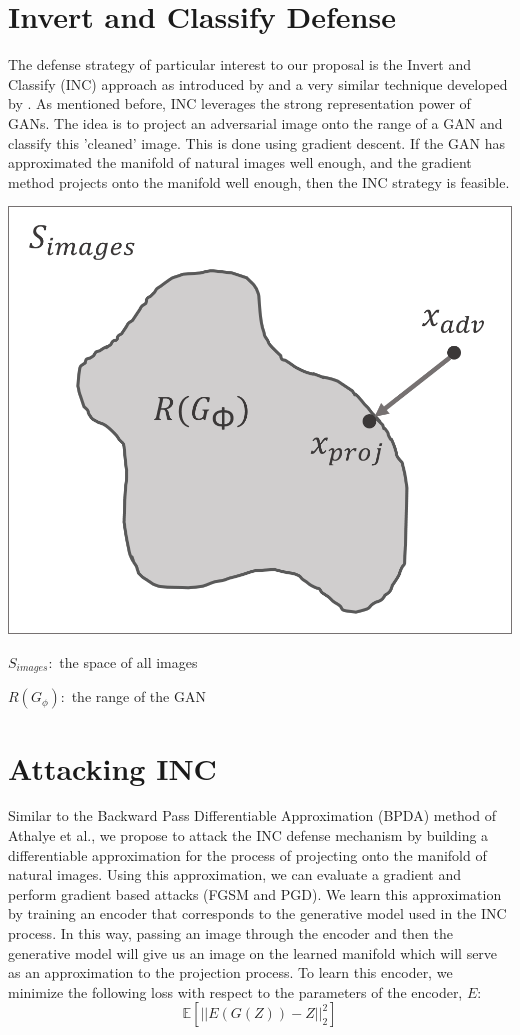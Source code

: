 \documentclass[twoside]{article}
\theoremstyle{definition}
\begin{document}
\section{Invert and Classify Defense}
The defense strategy of particular interest to our proposal is the Invert and Classify (INC) approach as introduced by \cite{2017arXiv171209196I} and a very similar technique developed by \cite{pixel}. As mentioned before, INC leverages the strong representation power
of GANs. The idea is to project an adversarial image onto the range of a GAN and classify this 'cleaned' image.
This is done using gradient descent. If the GAN has approximated the manifold of natural images well enough, and
the gradient method projects onto the manifold well enough, then the INC strategy is feasible.

\begin{center}
    \includegraphics[scale=0.3]{./projection_diagram.png}
\end{center}

$S_{images}:$ the space of all images

$R(G_{\phi}):$ the range of the GAN

\section{Attacking INC}
Similar to the Backward Pass Differentiable Approximation (BPDA) method of Athalye et al., we propose to attack the INC defense mechanism by building a differentiable approximation for the process of projecting onto the manifold of natural images. Using this approximation, we can evaluate a gradient and perform gradient based attacks (FGSM and PGD). We learn this approximation by training an encoder that corresponds to the generative model used in the INC process. In this way, passing an image through the encoder and then the generative model will give us an image on the learned manifold which will serve as an approximation to the projection process. To learn this encoder, we minimize the following loss with respect to the parameters of the encoder, $E$:
\begin{equation}
    \mathbb{E} [||E(G(Z)) - Z||_2^2]
\end{equation}
\end{document}

